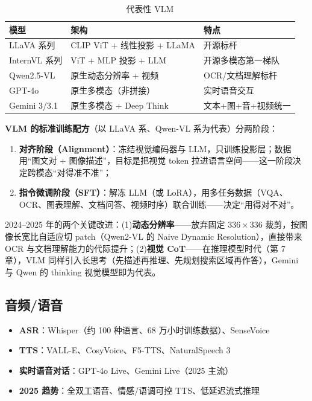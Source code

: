 \documentclass[12pt,a4paper]{article}
\begin{document}
\begin{table}[htbp]
\centering
\small
\begin{tabular}{@{}llp{4.5cm}@{}}
\toprule
\textbf{模型} & \textbf{架构} & \textbf{特点}\\
\midrule
LLaVA 系列 & CLIP ViT + 线性投影 + LLaMA & 开源标杆\\
InternVL 系列 & ViT + MLP 投影 + LLM & 开源多模态第一梯队\\
Qwen2.5-VL & 原生动态分辨率 + 视频 & OCR/文档理解标杆\\
GPT-4o & 原生多模态（非拼接） & 实时语音交互\\
Gemini 3/3.1 & 原生多模态 + Deep Think & 文本+图+音+视频统一\\
\bottomrule
\end{tabular}
\caption{代表性 VLM}
\end{table}

\textbf{VLM 的标准训练配方}（以 LLaVA 系、Qwen-VL 系为代表）分两阶段：
\begin{enumerate}
  \item \textbf{对齐阶段（Alignment）}：冻结视觉编码器与 LLM，只训练投影层；数据用“图文对 + 图像描述”，目标是把视觉 token 拉进语言空间——这一阶段决定跨模态“对得准不准”；
  \item \textbf{指令微调阶段（SFT）}：解冻 LLM（或 LoRA），用多任务数据（VQA、OCR、图表理解、文档问答、视频时序）联合训练——决定“用得对不对”。
\end{enumerate}
2024--2025 年的两个关键改进：(1)\textbf{动态分辨率}——放弃固定 $336\times336$ 裁剪，按图像长宽比自适应切 patch（Qwen2-VL 的 Naive Dynamic Resolution），直接带来 OCR 与文档理解能力的代际提升；(2)\textbf{视觉 CoT}——在推理模型时代（第 7 章），VLM 同样引入长思考（先描述再推理、先规划搜索区域再作答），Gemini 与 Qwen 的 thinking 视觉模型即为代表。

\subsection{音频/语音}

\begin{itemize}
  \item \textbf{ASR}：Whisper（约 100 种语言、68 万小时训练数据）、SenseVoice
  \item \textbf{TTS}：VALL-E、CosyVoice、F5-TTS、NaturalSpeech 3
  \item \textbf{实时语音对话}：GPT-4o Live、Gemini Live（2025 主流）
  \item \textbf{2025 趋势}：全双工语音、情感/语调可控 TTS、低延迟流式推理
\end{itemize}
\end{document}

